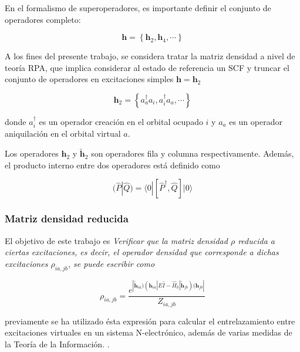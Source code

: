 \documentclass{beamer}
\begin{document}
\begin{frame}
  En el formalismo de superoperadores, es importante definir el conjunto de operadores completo:

\begin{equation*}
	\bm{h} =    \left\{ \bm{h}_2, \bm{h}_4, \cdots \right\} 
\end{equation*}

A los fines del presente trabajo, se considera tratar la matriz densidad a nivel de teoría RPA, 
que implica considerar al estado de referencia un SCF 
y truncar el conjunto de operadores en excitaciones simples   $ \bm{h} = \bm{h}_2 $ 


\begin{equation*}
	\bm{h}_2 = \left\{a^\dagger_a a_i, a^\dagger_i a_a, \cdots\right\}
\end{equation*}

donde $a^\dagger_i$ es un operador creación en el orbital ocupado $i$ y 
$a_a$ es un operador aniquilación en el orbital virtual $a$. 
  

Los operadores $ \bm{h}_2 $ y $ \bm{\widetilde{h}}_2 $ son operadores 
fila y columna respectivamente. Además, el producto interno entre dos operadores está definido como 

\begin{equation*}
	(\hat{P}|\hat{Q}) = \langle 0 | [\hat{P}^\dagger ,\hat{Q}] |0 \rangle
\end{equation*}

\end{frame}

\begin{frame}
  \frametitle{Matriz densidad reducida}
  El objetivo de este trabajo es \textit{Verificar que la matriz densidad $\rho$ reducida a ciertas excitaciones, 
  es decir, el operador densidad que corresponde a dichas excitaciones $\rho_{ia,jb}$, se puede escribir como}

  \begin{equation*}
  \rho_{ia,jb} =  \frac{e^{| \bm{\widetilde{h}}_{ia} ) (\bm{h}_{ia}| E \hat{I} - \hat{H}_0 | \bm{\widetilde{h}}_{jb} )   (\bm{h}_{jb}|}}
  {Z_{ia,jb}}
\end{equation*}

previamente se ha utilizado ésta expresión para calcular el entrelazamiento entre excitaciones virtuales en un sistema
N-electrónico, además de varias medidas de la Teoría de la Información.
.


\end{frame}
\end{document}
